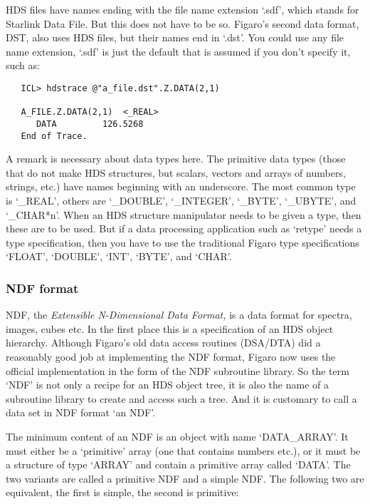    HDS files have names ending with the file name extension `.sdf',
   which stands for Starlink Data File. But this does not have to be so.
   Figaro's second data format, DST, also uses HDS files, but their
   names end in `.dst'. You could use any file name extension, `.sdf'
   is just the default that is assumed if you don't specify it, such
   as:

\begin{verbatim}
   ICL> hdstrace @"a_file.dst".Z.DATA(2,1)

   A_FILE.Z.DATA(2,1)  <_REAL>
      DATA         126.5268
   End of Trace.
\end{verbatim}

   A remark is necessary about data types here. The primitive data
   types (those that do not make HDS structures, but scalars, vectors
   and arrays of numbers, strings, etc.) have names beginning with an
   underscore. The most common type is `\_REAL', others are
   `\_DOUBLE', `\_INTEGER', `\_BYTE', `\_UBYTE', and `\_CHAR*n'. When
   an HDS structure manipulator needs to be given a type, then these
   are to be used. But if a data processing application such as
   `retype' needs a type specification, then you have to use the
   traditional Figaro type specifications `FLOAT', `DOUBLE', `INT',
   `BYTE', and `CHAR'.


\subsubsection{\label{filesndf}NDF format}

   NDF, the
{\em Extensible N-Dimensional Data Format,\/}
   is a data format for spectra, images, cubes etc. In the first place
   this is a specification of an HDS object hierarchy. Although
   Figaro's old data access routines (DSA/DTA) did a reasonably good
   job at implementing the NDF format, Figaro now uses the official
   implementation in the form of the NDF subroutine library.
   So the term `NDF' is not only a recipe for an HDS object tree, it
   is also the name of a subroutine library to create and access such
   a tree. And it is customary to call a data set in NDF format `an
   NDF'.

   The minimum content of an NDF is an object with name
   `DATA\_ARRAY'. It must either be a `primitive' array (one that
   contains numbers etc.), or it must be a structure of type `ARRAY' and
   contain a primitive array called `DATA'. The two variants are
   called a primitive NDF and a simple NDF. The following two are
   equivalent, the first is simple, the second is primitive:

